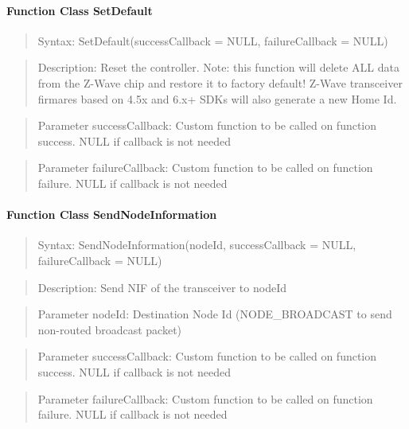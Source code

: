 \paragraph {Function Class SetDefault}
\begin{quote} Syntax: SetDefault(successCallback = NULL, failureCallback = NULL)\end{quote}
\begin{quote} Description: Reset the controller. Note: this function will delete ALL data 
from the Z-Wave chip and restore it to factory default! Z-Wave transceiver firmares based 
on 4.5x and 6.x+ SDKs will also generate a new Home Id.\end{quote}
\begin{quote} Parameter successCallback: Custom function to be called on function success. NULL if callback is not needed\end{quote} 
\begin{quote} Parameter failureCallback: Custom function to be called on function failure. NULL if callback is not needed\end{quote} 

\paragraph {Function Class SendNodeInformation}
\begin{quote} Syntax: SendNodeInformation(nodeId, successCallback = NULL, failureCallback = NULL)\end{quote}
\begin{quote} Description: Send NIF of the transceiver to nodeId\end{quote}
\begin{quote} Parameter nodeId: Destination Node Id (NODE\_BROADCAST to send non-routed broadcast packet)\end{quote}
\begin{quote} Parameter successCallback: Custom function to be called on function success. NULL if callback is not needed\end{quote} 
\begin{quote} Parameter failureCallback: Custom function to be called on function failure. NULL if callback is not needed\end{quote} 

